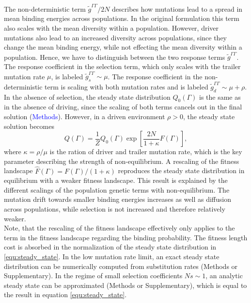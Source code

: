 \documentclass[10pt,a4paper]{article}
\begin{document}
	The non-deterministic term $\tilde{g}^{\Gamma\Gamma}/2N$ describes how mutations lead to a spread in mean binding energies across populations. In the original formulation this term also scales with the mean diversity within a population. However, driver mutations also lead to an increased diversity across populations, since they change the mean binding energy, while not effecting the mean diversity within a population. Hence, we have to distinguish between the two response terms $\tilde{g}^{\Gamma\Gamma}$. The response coefficient in the selection term, which only scales with the trailer mutation rate $\mu$, is labeled $\tilde{g}^{\Gamma\Gamma}_s\sim\mu$. The response coefficient in the non-deterministic term is scaling with both mutation rates and is labeled $\tilde{g}^{\Gamma\Gamma}_d\sim\mu+\rho$.\\
	In the absence of selection, the steady state distribution $Q_0(\Gamma)$ is the same as in the absence of driving, since the scaling of both terms cancels out in the final solution (\textcolor{blue}{Methods}). However, in a driven environment $\rho>0$, the steady state solution becomes
	\begin{equation}
		Q(\Gamma)=\frac{1}{Z}Q_0(\Gamma)\exp\left[\frac{2N}{1+\kappa}F(\Gamma)\right],\label{equ:steady_state}
	\end{equation}
	where $\kappa=\rho/\mu$ is the ration of driver and trailer mutation rate, which is the key parameter describing the strength of non-equilibrium. A rescaling of the fitness landscape $\hat{F}(\Gamma)=F(\Gamma)/(1+\kappa)$ reproduces the steady state distribution in equilibrium with a weaker fitness landscape. This result is explained by the different scalings of the population genetic terms with non-equilibrium. The mutation drift towards smaller binding energies increases as well as diffusion across populations, while selection is not increased and therefore relatively weaker.\\
	Note, that the rescaling of the fitness landscape effectively only applies to the term in the fitness landscape regarding the binding probability. The fitness length cost is absorbed in the normalization of the steady state distribution in \ref{equ:steady_state}.
	In the low mutation rate limit, an exact steady state distribution can be numerically computed from substitution rates (Methods or Supplementary). In the regime of small selection coefficients $Ns\sim1$, an analytic steady state can be approximated (Methods or Supplementary), which is equal to the result in equation \ref{equ:steady_state}.
\end{document}
